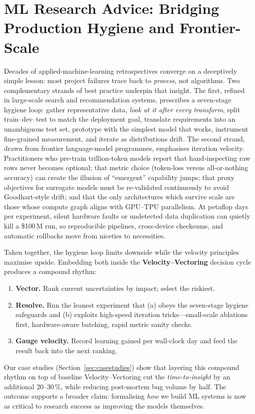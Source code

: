 
\section{ML Research Advice: Bridging Production Hygiene and Frontier-Scale}
\label{sec:ml_research_advice}

Decades of applied-machine-learning retrospectives converge on a deceptively
simple lesson: most project failures trace back to \emph{process}, not
algorithms.
Two complementary strands of best practice underpin that insight.
The first, refined in large-scale search and recommendation systems, prescribes
a seven-stage hygiene loop: gather representative data, \emph{look at it after
every transform}, split train--dev--test to match the deployment goal, translate
requirements into an unambiguous test set, prototype with the simplest model
that works, instrument fine-grained measurement, and iterate as distributions
drift.
The second strand, drawn from frontier language-model programmes,
emphasises iteration velocity.
Practitioners who pre-train trillion-token
models report that hand-inspecting raw rows never becomes optional; that metric
choice (token-loss versus all-or-nothing accuracy) can create the illusion of
``emergent'' capability jumps; that proxy objectives for surrogate models must
be re-validated continuously to avoid Goodhart-style drift; and that the only
architectures which survive scale are those whose compute graph aligns with
GPU--TPU parallelism.
At petaflop days per experiment, silent hardware faults
or undetected data duplication can quietly kill a \$100\,M run, so reproducible
pipelines, cross-device checksums, and automatic rollbacks move from niceties
to necessities.

Taken together, the hygiene loop limits downside while the velocity principles
maximise upside.
Embedding both inside the \textbf{Velocity--Vectoring} decision
cycle produces a compound rhythm:

\begin{enumerate}[label=\roman*,leftmargin=*]
    \item \textbf{Vector.}  Rank current uncertainties by impact; select the
          riskiest.
    \item \textbf{Resolve.}  Run the leanest experiment that (a) obeys the
          seven-stage hygiene safeguards and (b) exploits high-speed iteration
          tricks---small-scale ablations first, hardware-aware batching, rapid
          metric sanity checks.
    \item \textbf{Gauge velocity.}  Record learning gained per wall-clock day and
          feed the result back into the next ranking.
\end{enumerate}

Our case studies (Section~\ref{sec:casestudies})  show that layering this
compound rhythm on top of baseline Velocity--Vectoring cut the
\emph{time-to-insight} by an additional 20--30\,\%, while reducing post-mortem
bug volume by half.
The outcome supports a broader claim: formalising
\emph{how} we build ML systems is now as critical to research success as
improving the models themselves.
